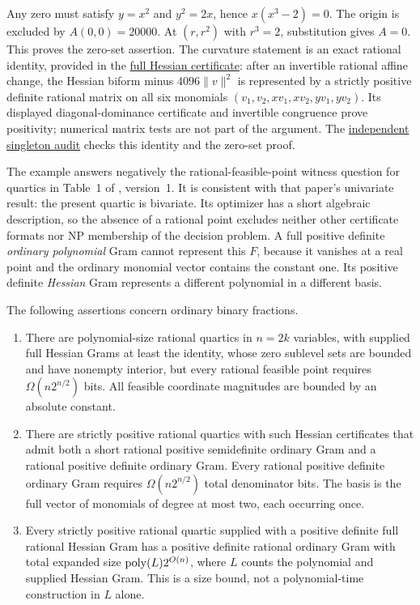 Any zero must satisfy $y=x^2$ and $y^2=2x$, hence
$x(x^3-2)=0$. The origin is excluded by $A(0,0)=20000$.
At $(r,r^2)$ with $r^3=2$, substitution gives $A=0$.
This proves the zero-set assertion. The curvature statement is an
exact rational identity, provided in the
\href{../../research-20260927/convex-quartic-rational-sos.md}{full Hessian certificate}:
after an invertible rational affine change, the Hessian biform minus
$4096\|v\|^2$ is represented by a strictly positive definite
rational matrix on all six monomials
$(v_1,v_2,xv_1,xv_2,yv_1,yv_2)$. Its displayed diagonal-dominance
certificate and invertible congruence prove positivity; numerical
matrix tests are not part of the argument. The
\href{../reviews/exact-core/singleton-review.md}{independent singleton audit}
checks this identity and the zero-set proof.

The example answers negatively the rational-feasible-point witness
question for quartics in Table~1 of \citet{SlotSteurerWiedmer2025}, version~1.
It is consistent with that paper's univariate result: the present
quartic is bivariate. Its optimizer has a short algebraic description,
so the absence of a rational point excludes neither other certificate
formats nor NP membership of the decision problem. A full positive
definite \emph{ordinary polynomial} Gram cannot represent this $F$,
because it vanishes at a real point and the ordinary monomial vector
contains the constant one. Its positive definite \emph{Hessian} Gram
represents a different polynomial in a different basis.

\begin{theorem}
\label{thm:expanded-witnesses}
The following assertions concern ordinary binary fractions.
\begin{enumerate}[label=(\roman*)]
\item There are polynomial-size rational quartics in $n=2k$
variables, with supplied full Hessian Grams at least the identity,
whose zero sublevel sets are bounded and have nonempty interior,
but every rational feasible point requires
$\Omega(n2^{n/2})$ bits. All feasible coordinate magnitudes are
bounded by an absolute constant.
\item There are strictly positive rational quartics with such
Hessian certificates that admit both a short rational positive
semidefinite ordinary Gram and a rational positive definite ordinary
Gram. Every rational positive definite ordinary Gram requires
$\Omega(n2^{n/2})$ total denominator bits. The basis is the
full vector of monomials of degree at most two, each occurring once.
\item Every strictly positive rational quartic supplied with a
positive definite full rational Hessian Gram has a positive definite
rational ordinary Gram with total expanded size
$\operatorname{poly}(L)2^{O(n)}$, where $L$ counts the polynomial and supplied
Hessian Gram. This is a size bound, not a polynomial-time construction
in $L$ alone.
\end{enumerate}
\end{theorem}

